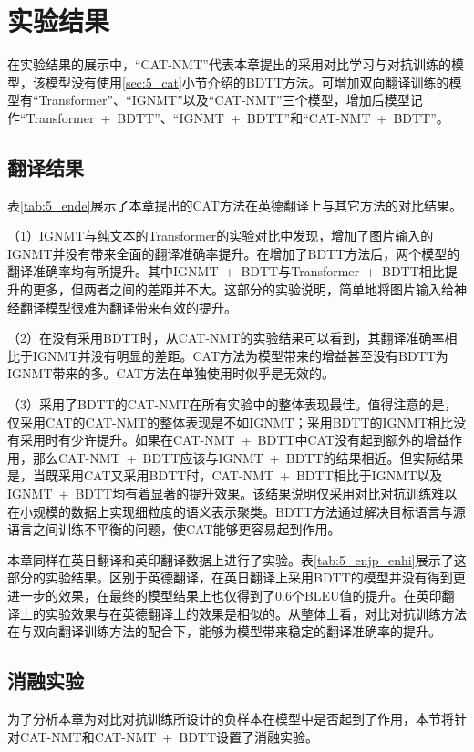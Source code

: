 \section{实验结果}

在实验结果的展示中，“CAT-NMT”代表本章提出的采用对比学习与对抗训练的模型，该模型没有使用\ref{sec:5_cat}小节介绍的BDTT方法。可增加双向翻译训练的模型有“Transformer”、“IGNMT”以及“CAT-NMT”三个模型，增加后模型记作“Transformer~+~BDTT”、“IGNMT~+~BDTT”和“CAT-NMT~+~BDTT”。

\subsection{翻译结果}
\label{sec:5_translation_results}

表\ref{tab:5_ende}展示了本章提出的CAT方法在英德翻译上与其它方法的对比结果。

（1）IGNMT与纯文本的Transformer的实验对比中发现，增加了图片输入的IGNMT并没有带来全面的翻译准确率提升。在增加了BDTT方法后，两个模型的翻译准确率均有所提升。其中IGNMT~+~BDTT与Transformer~+~BDTT相比提升的更多，但两者之间的差距并不大。这部分的实验说明，简单地将图片输入给神经翻译模型很难为翻译带来有效的提升。

（2）在没有采用BDTT时，从CAT-NMT的实验结果可以看到，其翻译准确率相比于IGNMT并没有明显的差距。CAT方法为模型带来的增益甚至没有BDTT为IGNMT带来的多。CAT方法在单独使用时似乎是无效的。

（3）采用了BDTT的CAT-NMT在所有实验中的整体表现最佳。值得注意的是，仅采用CAT的CAT-NMT的整体表现是不如IGNMT；采用BDTT的IGNMT相比没有采用时有少许提升。如果在CAT-NMT~+~BDTT中CAT没有起到额外的增益作用，那么CAT-NMT~+~BDTT应该与IGNMT~+~BDTT的结果相近。但实际结果是，当既采用CAT又采用BDTT时，CAT-NMT~+~BDTT相比于IGNMT以及IGNMT~+~BDTT均有着显著的提升效果。该结果说明仅采用对比对抗训练难以在小规模的数据上实现细粒度的语义表示聚类。BDTT方法通过解决目标语言与源语言之间训练不平衡的问题，使CAT能够更容易起到作用。


本章同样在英日翻译和英印翻译数据上进行了实验。表\ref{tab:5_enjp_enhi}展示了这部分的实验结果。区别于英德翻译，在英日翻译上采用BDTT的模型并没有得到更进一步的效果，在最终的模型结果上也仅得到了0.6个BLEU值的提升。在英印翻译上的实验效果与在英德翻译上的效果是相似的。从整体上看，对比对抗训练方法在与双向翻译训练方法的配合下，能够为模型带来稳定的翻译准确率的提升。

\subsection{消融实验}
\label{sec:5_ablation_study}

为了分析本章为对比对抗训练所设计的负样本在模型中是否起到了作用，本节将针对CAT-NMT和CAT-NMT~+~BDTT设置了消融实验。

